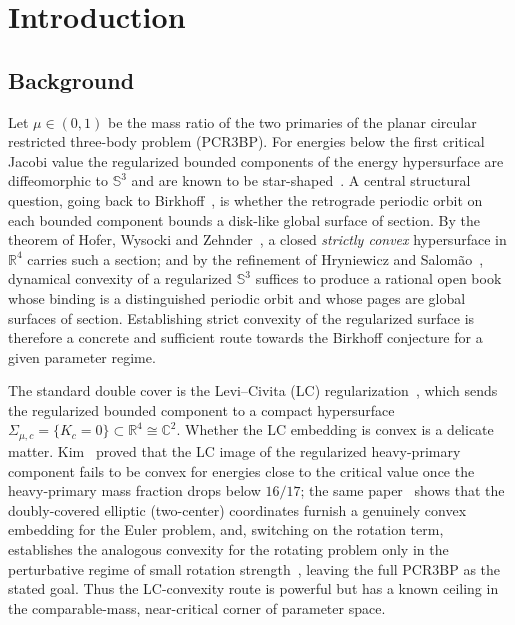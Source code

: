\documentclass[11pt,reqno]{amsart}
\theoremstyle{plain}
\theoremstyle{definition}
\newcommand{\R}{\mathbb{R}}
\newcommand{\C}{\mathbb{C}}
\newcommand{\Sph}{\mathbb{S}}
\begin{document}
\begin{abstract}
Lagrange point enters the surface; the Earth component ($m_r\approx 0.9878$) is non-convex on a macroscopic near-critical window, recovering LC-convexity only for $\Delta c\gtrsim 1.2\times 10^{-2}$. This locates the natural boundary of the LC route at the critical limit. (This is version~2 of the paper: it corrects a mass-convention mislabeling and a scanning-heuristic flaw of version~1; see the erratum note in Section~\ref{sec:map}.)
\end{abstract}

\maketitle

\section{Introduction}\label{sec:intro}

\subsection{Background}
Let $\mu\in(0,1)$ be the mass ratio of the two primaries of the planar circular restricted three-body problem (PCR3BP). For energies below the first critical Jacobi value the regularized bounded components of the energy hypersurface are diffeomorphic to $\Sph^3$ and are known to be star-shaped~\cite{AFKP}. A central structural question, going back to Birkhoff~\cite{Birkhoff}, is whether the retrograde periodic orbit on each bounded component bounds a disk-like global surface of section. By the theorem of Hofer, Wysocki and Zehnder~\cite{HWZ}, a closed \emph{strictly convex} hypersurface in $\R^4$ carries such a section; and by the refinement of Hryniewicz and Salom\~ao~\cite{HS}, dynamical convexity of a regularized $\Sph^3$ suffices to produce a rational open book whose binding is a distinguished periodic orbit and whose pages are global surfaces of section. Establishing strict convexity of the regularized surface is therefore a concrete and sufficient route towards the Birkhoff conjecture for a given parameter regime.

The standard double cover is the Levi--Civita (LC) regularization~\cite{LeviCivita}, which sends the regularized bounded component to a compact hypersurface $\Sigma_{\mu,c}=\{K_c=0\}\subset\R^4\cong\C^2$. Whether the LC embedding is convex is a delicate matter. Kim~\cite[Thm.~1.3]{Kim} proved that the LC image of the regularized heavy-primary component fails to be convex for energies close to the critical value once the heavy-primary mass fraction drops below $16/17$; the same paper~\cite[Thm.~1.1]{Kim} shows that the doubly-covered elliptic (two-center) coordinates furnish a genuinely convex embedding for the Euler problem, and, switching on the rotation term, establishes the analogous convexity for the rotating problem only in the perturbative regime of small rotation strength~\cite[Rmk.~1.2]{Kim}, leaving the full PCR3BP as the stated goal. Thus the LC-convexity route is powerful but has a known ceiling in the comparable-mass, near-critical corner of parameter space.
\end{document}

